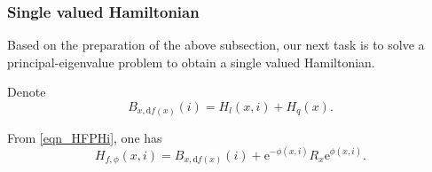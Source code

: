 \documentclass[a4paper]{article}
\numberwithin{equation}{section}
\theoremstyle{definition}
\begin{document}
\subsubsection{Single valued Hamiltonian}
Based on the preparation of the above subsection, our next task is to solve a principal-eigenvalue problem to obtain a single valued Hamiltonian.
\par
Denote
\begin{equation}\label{eqn_BXI}
    B_{x,\mathrm{d}f(x)}(i)=H_l(x,i)+H_q(x).
\end{equation}

From \eqref{eqn_HFPHi}, one has
\begin{equation*}
	H_{f,\phi}(x,i)=B_{x,\mathrm{d}f(x)}(i)+\mathrm{e}^{-\phi(x,i)}R_x\mathrm{e}^{\phi(x,i)}.
\end{equation*}
\end{document}
